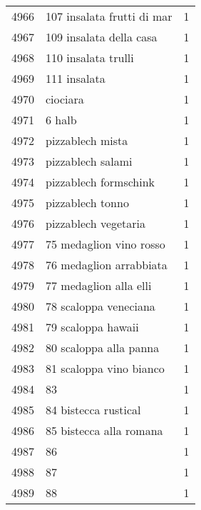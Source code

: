 \begin{tabular}{llr}
4966 &                         107 insalata frutti di mar &      1 \\
4967 &                            109 insalata della casa &      1 \\
4968 &                                110 insalata trulli &      1 \\
4969 &                                       111 insalata &      1 \\
4970 &                                           ciociara &      1 \\
4971 &                                             6 halb &      1 \\
4972 &                                   pizzablech mista &      1 \\
4973 &                                  pizzablech salami &      1 \\
4974 &                              pizzablech formschink &      1 \\
4975 &                                   pizzablech tonno &      1 \\
4976 &                               pizzablech vegetaria &      1 \\
4977 &                            75 medaglion vino rosso &      1 \\
4978 &                            76 medaglion arrabbiata &      1 \\
4979 &                             77 medaglion alla elli &      1 \\
4980 &                              78 scaloppa veneciana &      1 \\
4981 &                                 79 scaloppa hawaii &      1 \\
4982 &                             80 scaloppa alla panna &      1 \\
4983 &                            81 scaloppa vino bianco &      1 \\
4984 &                                                 83 &      1 \\
4985 &                               84 bistecca rustical &      1 \\
4986 &                            85 bistecca alla romana &      1 \\
4987 &                                                 86 &      1 \\
4988 &                                                 87 &      1 \\
4989 &                                                 88 &      1 \\

\end{tabular}

